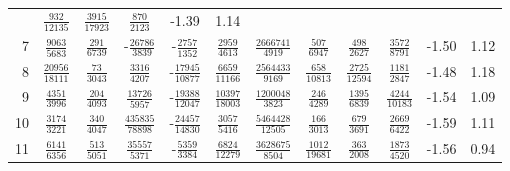 \begin{sidewaystable}
\begin{tabular}{r|ccccccccc|c@{ -- }c@{\%}}
&  $\frac{             932}{           12135}$
&  $\frac{            3915}{           17923}$
&  $\frac{             870}{            2123}$
&  -1.39 &  1.14
\\
7
&  $\frac{            9063}{            5683}$
&  $\frac{             291}{            6739}$
& -$\frac{           26786}{            3839}$
& -$\frac{            2757}{            1352}$
&  $\frac{            2959}{            4613}$
&  $\frac{         2666741}{            4919}$
&  $\frac{             507}{            6947}$
&  $\frac{             498}{            2627}$
&  $\frac{            3572}{            8791}$
&  -1.50 &  1.12
\\
8
&  $\frac{           20956}{           18111}$
&  $\frac{              73}{            3043}$
&  $\frac{            3316}{            4207}$
& -$\frac{           17945}{           10877}$
&  $\frac{            6659}{           11166}$
&  $\frac{         2564433}{            9169}$
&  $\frac{             658}{           10813}$
&  $\frac{            2725}{           12594}$
&  $\frac{            1181}{            2847}$
&  -1.48 &  1.18
\\
9
&  $\frac{            4351}{            3996}$
&  $\frac{             204}{            4093}$
&  $\frac{           13726}{            5957}$
& -$\frac{           19388}{           12047}$
&  $\frac{           10397}{           18003}$
&  $\frac{         1200048}{            3823}$
&  $\frac{             246}{            4289}$
&  $\frac{            1395}{            6839}$
&  $\frac{            4244}{           10183}$
&  -1.54 &  1.09
\\
10
&  $\frac{            3174}{            3221}$
&  $\frac{             340}{            4047}$
&  $\frac{          435835}{           78898}$
& -$\frac{           24457}{           14830}$
&  $\frac{            3057}{            5416}$
&  $\frac{         5464428}{           12505}$
&  $\frac{             166}{            3013}$
&  $\frac{             679}{            3691}$
&  $\frac{            2669}{            6422}$
&  -1.59 &  1.11
\\
11
&  $\frac{            6141}{            6356}$
&  $\frac{             513}{            5051}$
&  $\frac{           35557}{            5371}$
& -$\frac{            5359}{            3384}$
&  $\frac{            6824}{           12279}$
&  $\frac{         3628675}{            8504}$
&  $\frac{            1012}{           19681}$
&  $\frac{             363}{            2008}$
&  $\frac{            1873}{            4520}$
&  -1.56 &  0.94
\\

\end{tabular}
\end{sidewaystable}
